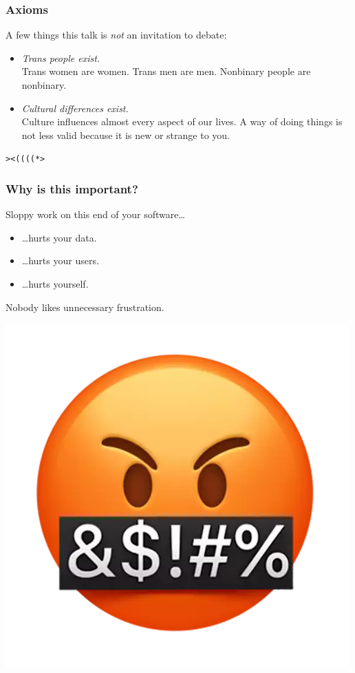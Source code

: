 \documentclass[aspectratio=169,x11names]{beamer}
\begin{document}
\begin{frame}
\frametitle{Axioms}
A few things this talk is \emph{not} an invitation to debate:
\bigskip

\begin{itemize}
\item\emph{Trans people exist.}\\
Trans women are women. Trans men are men. Nonbinary people are nonbinary.
\medskip

\item\emph{Cultural differences exist.}\\
Culture influences almost every aspect of our lives. A way of doing things is not less valid because it is new or strange to you.
\end{itemize}
\bigskip

\huge
\begin{center}
\texttt{><((((*>}
\end{center}

\end{frame}

\begin{frame}
\frametitle{Why is this important?}
\begin{minipage}{0.55\textwidth}
\large
Sloppy work on this end of your software\dots
\bigskip
\begin{itemize}
\item\dots hurts your data.
\item\dots hurts your users.
\item\dots hurts yourself.
\end{itemize}
\medskip

Nobody likes unnecessary frustration.
\end{minipage}%
\begin{minipage}{0.45\textwidth}
\begin{center}
\includegraphics[scale=0.25]{images/curses.png} 
\end{center}
\end{minipage}
\end{frame}
\end{document}
